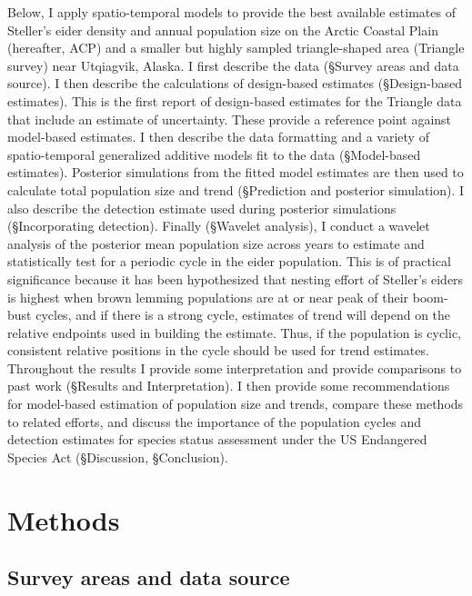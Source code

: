 \documentclass[
  10pt,
  letterpaper,
]{article}
\begin{document}
Below, I apply spatio-temporal models to provide the best available
estimates of Steller's eider density and annual population size on the
Arctic Coastal Plain (hereafter, ACP) and a smaller but highly sampled
triangle-shaped area (Triangle survey) near Utqiagvik, Alaska. I first
describe the data (\S Survey areas and data source). I then describe the
calculations of design-based estimates (\S Design-based estimates). This
is the first report of design-based estimates for the Triangle data that
include an estimate of uncertainty. These provide a reference point
against model-based estimates. I then describe the data formatting and a
variety of spatio-temporal generalized additive models fit to the data
(\S Model-based estimates). Posterior simulations from the fitted model
estimates are then used to calculate total population size and trend
(\S Prediction and posterior simulation). I also describe the detection
estimate used during posterior simulations (\S Incorporating detection).
Finally (\S Wavelet analysis), I conduct a wavelet analysis of the
posterior mean population size across years to estimate and
statistically test for a periodic cycle in the eider population. This is
of practical significance because it has been hypothesized that nesting
effort of Steller's eiders is highest when brown lemming populations are
at or near peak of their boom-bust cycles, and if there is a strong
cycle, estimates of trend will depend on the relative endpoints used in
building the estimate. Thus, if the population is cyclic, consistent
relative positions in the cycle should be used for trend estimates.
Throughout the results I provide some interpretation and provide
comparisons to past work (\S Results and Interpretation). I then provide
some recommendations for model-based estimation of population size and
trends, compare these methods to related efforts, and discuss the
importance of the population cycles and detection estimates for species
status assessment under the US Endangered Species Act (\S Discussion,
\S Conclusion).

\section{Methods}\label{methods}

\subsection{Survey areas and data
source}\label{survey-areas-and-data-source}
\end{document}
